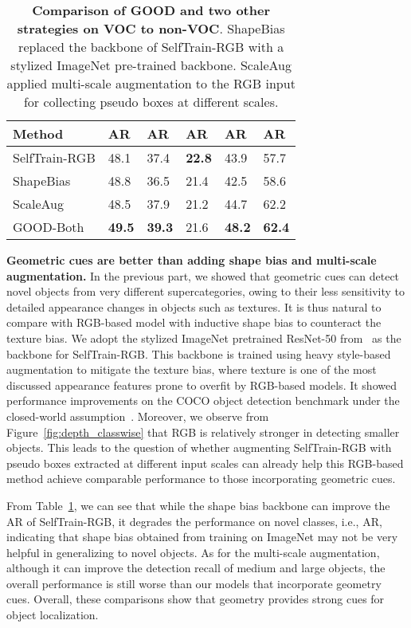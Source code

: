 \documentclass{article} \usepackage{iclr2023_conference,times}
\begin{document}
\begin{table}
    \caption{\textbf{Comparison of GOOD and two other strategies on VOC to non-VOC}. ShapeBias replaced the backbone of SelfTrain-RGB with a stylized ImageNet pre-trained backbone. ScaleAug applied multi-scale augmentation to the RGB input for collecting pseudo boxes at different scales.}
\begin{tabular}{l|l|l|l|l|l}
						\toprule
						Method &  AR & AR & AR & AR & AR  \\ \midrule
                            SelfTrain-RGB & 48.1 & 37.4   &\textbf{22.8}  & 43.9 & 57.7 \\ \midrule
                             ShapeBias  & 48.8 & 36.5 & 21.4 & 42.5 & 58.6 \\
                             ScaleAug & 48.5 & 37.9 & 21.2 & 44.7 & 62.2\\
                             GOOD-Both & \textbf{49.5}  & \textbf{39.3} & 21.6 & \textbf{48.2} & \textbf{62.4}  \\
                    \bottomrule
						\end{tabular}


	\label{table:generalization_comparison}\vspace{-0.2em}
\end{table}
\textbf{Geometric cues are better than adding shape bias and multi-scale augmentation.}
In the previous part, we showed that geometric cues can detect novel objects from very different supercategories, owing to their less sensitivity to detailed appearance changes in objects such as textures. It is thus natural to compare with RGB-based model with inductive shape bias to counteract the texture bias. We adopt the stylized ImageNet pretrained ResNet-50 from~\citep{geirhos2018} as the backbone for SelfTrain-RGB. This backbone is trained using heavy style-based augmentation to mitigate the texture bias, where texture is one of the most discussed appearance features prone to overfit by RGB-based models. It showed performance improvements on the COCO object detection benchmark under the closed-world assumption~\citep{geirhos2018}.
Moreover, we observe from Figure~\ref{fig:depth_classwise} that RGB is relatively stronger in detecting smaller objects. This leads to the question of whether augmenting SelfTrain-RGB with pseudo boxes extracted at different input scales can already help this RGB-based method achieve comparable performance to those incorporating geometric cues.

From Table~\ref{table:generalization_comparison}, we can see that while the shape bias backbone can improve the AR of SelfTrain-RGB, it degrades the performance on novel classes, i.e., AR, indicating that shape bias obtained from training on ImageNet may not be very helpful in generalizing to novel objects. As for the multi-scale augmentation, although it can improve the detection recall of medium and large objects, the overall performance is still worse than our models that incorporate geometry cues. Overall, these comparisons show that geometry provides strong cues for object localization.
\end{document}
